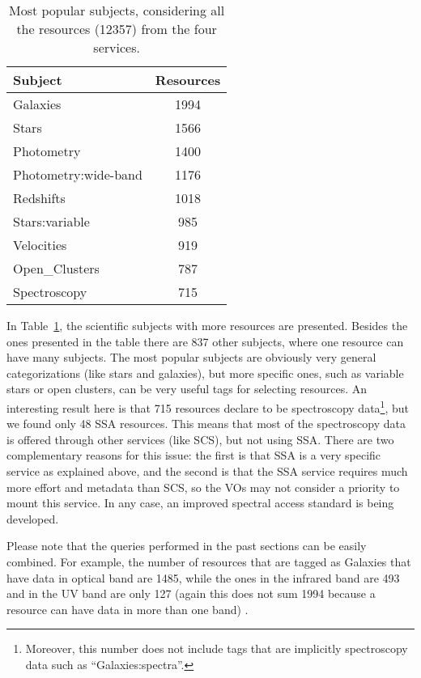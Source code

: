 \begin{table}
\begin{center}
\begin{tabular}{|l|c|}
\hline
\textbf{Subject} & \textbf{Resources} \\
\hline
Galaxies  &  1994  \\
Stars  &  1566  \\
Photometry  &  1400  \\
Photometry:wide-band  &  1176  \\
Redshifts  &  1018  \\
Stars:variable  &  985  \\
Velocities  &  919  \\
Open\_Clusters  &  787  \\
Spectroscopy  &  715  \\
\hline
\end{tabular}
\label{tab:resSub}
\caption{Most popular subjects, considering all the resources (12357) from the four services.}
\end{center}
\end{table}

In Table~\ref{tab:resSub}, the scientific subjects with more resources are presented. Besides the ones
presented in the table there are 837 other subjects, where one resource can have many subjects. 
The most popular subjects are obviously very general categorizations (like stars and galaxies), but
more specific ones, such as variable stars or open clusters, can be very useful tags for selecting
resources. An interesting result here is that 715 resources declare to be spectroscopy data\footnote{Moreover, this number does not include tags that are implicitly spectroscopy data such as ``Galaxies:spectra''.}, but we
found only 48 SSA resources. This means that most of the spectroscopy data is offered through other
services (like SCS), but not using SSA. There are two complementary reasons for this issue: the first
is that SSA is a very specific service as explained above, and the second is that the SSA service requires
much more effort and metadata than SCS, so the VOs may not consider a priority to mount this service.
In any case, an improved spectral access standard is being developed.

Please note that the queries performed in the past sections can be easily combined. For example,
the number of resources that are tagged as Galaxies that have data in optical band are 1485, while the ones in
the infrared band are 493 and in the UV band are only 127 (again this does not sum 1994 because a resource can have data
in more than one band) . 


